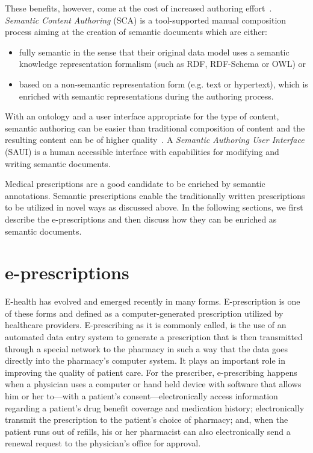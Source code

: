 \documentclass[10pt, conference, compsocconf]{IEEEtran}
\begin{document}
These benefits, however, come at the cost of increased authoring effort~\cite{hasida2007,uren2006}.
\emph{Semantic Content Authoring} (SCA) is a tool-supported manual composition process aiming at the creation of semantic documents which are either:
\begin{itemize}
	\item fully semantic in the sense that their original data model uses a semantic knowledge representation formalism (such as RDF, RDF-Schema or OWL) or
	\item based on a non-semantic representation form (e.g. text or hypertext), which is enriched with semantic representations during the authoring process.\\
\end{itemize}

With an ontology and a user interface appropriate for the type of content, semantic authoring can be easier than traditional composition of content and the resulting content can be of higher quality~\cite{hasida2007}.
A \emph{Semantic Authoring User Interface} (SAUI) is a human accessible interface with capabilities for modifying and writing semantic documents.

Medical prescriptions are a good candidate to be enriched by semantic annotations.
Semantic prescriptions enable the traditionally written prescriptions to be utilized in novel ways as discussed above.
In the following sections, we first describe the e-prescriptions and then discuss how they can be enriched as semantic documents.

\section{e-prescriptions}
\label{sec:epresc}
E-health has evolved and emerged recently in many forms.
E-prescription is one of these forms and defined as a computer-generated prescription utilized by healthcare providers.
E-prescribing as it is commonly called, is the use of an automated data entry system to generate a prescription that is then transmitted through a special network to the pharmacy in such a way that the data goes directly into the pharmacy’s computer system.
It plays an important role in improving the quality of patient care.
For the prescriber, e-prescribing happens when a physician uses a computer or hand held device with software that allows him or her to—with a patient’s consent—electronically access information regarding a patient’s drug benefit coverage and medication history; electronically transmit the prescription to the patient’s choice of pharmacy; and, when the patient runs out of refills, his or her pharmacist can also electronically send a renewal request to the physician’s office for approval.
\end{document}
